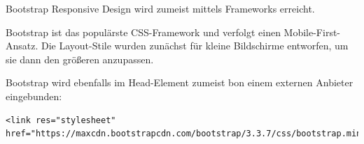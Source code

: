 \begin{bonus}{Bootstrap}
    Responsive Design wird zumeist mittels Frameworks erreicht.

    Bootstrap ist das populärste CSS-Framework und verfolgt einen Mobile-First-Ansatz.
    Die Layout-Stile wurden zunächst für kleine Bildschirme entworfen, um sie dann den größeren anzupassen.

    Bootstrap wird ebenfalls im Head-Element zumeist bon einem externen Anbieter eingebunden:
    \begin{lstlisting}[language=HTML5]
        <link res="stylesheet" href="https://maxcdn.bootstrapcdn.com/bootstrap/3.3.7/css/bootstrap.min.css">
    \end{lstlisting}
\end{bonus}